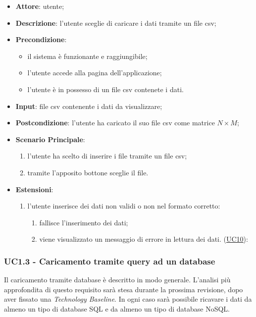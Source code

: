     \begin{itemize}
    \item \textbf{Attore}: utente;
    \item \textbf{Descrizione}: l'utente sceglie di caricare i dati tramite un file csv;
    \item \textbf{Precondizione}:
    \begin{itemize}
        \item il sistema è funzionante e raggiungibile;
        \item l'utente accede alla pagina dell'applicazione;
        \item l'utente è in possesso di un file csv contenete i dati.
    \end{itemize}
    \item \textbf{Input}: file csv contenente i dati da visualizzare;
    \item \textbf{Postcondizione}: l'utente ha caricato il suo file csv come matrice $N\times M$;
    \item \textbf{Scenario Principale}: 
        \begin{enumerate}
            \item l'utente ha scelto di inserire i file tramite un file csv;
            \item tramite l'apposito bottone sceglie il file.
        \end{enumerate}
        \item \textbf{Estensioni}:
        \begin{enumerate}
            \item l'utente inserisce dei dati non validi o non nel formato corretto:
                \begin{enumerate}
                    \item fallisce l'inserimento dei dati;
                    \item viene visualizzato un messaggio di errore in lettura dei dati. (\hyperref[uc10]{UC10}):
                \end{enumerate}
        \end{enumerate}  
    \end{itemize}

    
    \subsubsection{UC1.3 - Caricamento tramite query ad un database}
    \label{uc1.3}
    
    Il caricamento tramite database è descritto in modo generale. L'analisi più approfondita di questo requisito sarà stesa durante la prossima revisione, dopo aver fissato una \emph{Technology Baseline}. In ogni caso sarà possibile ricavare i dati da almeno un tipo di database SQL e da almeno un tipo di database NoSQL.
    
